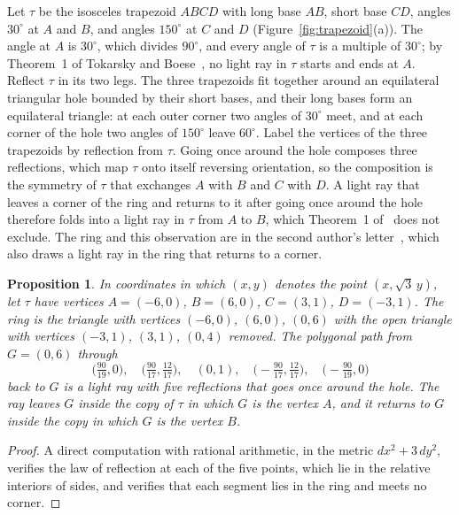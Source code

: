 \documentclass[11pt,a4paper]{article}
\theoremstyle{plain}
\newtheorem{proposition}[theorem]{Proposition}
\theoremstyle{definition}
\theoremstyle{remark}
\newcommand{\dg}{^\circ}
\numberwithin{equation}{section}
\begin{document}
Let $\tau$ be the isosceles trapezoid $ABCD$ with long base $AB$, short base $CD$, angles $30\dg$ at $A$ and $B$, and angles $150\dg$ at $C$ and $D$ (Figure~\ref{fig:trapezoid}(a)). The angle at $A$ is $30\dg$, which divides $90\dg$, and every angle of $\tau$ is a multiple of $30\dg$; by Theorem~1 of Tokarsky and Boese~\cite{TB}, no light ray in $\tau$ starts and ends at $A$. Reflect $\tau$ in its two legs. The three trapezoids fit together around an equilateral triangular hole bounded by their short bases, and their long bases form an equilateral triangle: at each outer corner two angles of $30\dg$ meet, and at each corner of the hole two angles of $150\dg$ leave $60\dg$. Label the vertices of the three trapezoids by reflection from $\tau$. Going once around the hole composes three reflections, which map $\tau$ onto itself reversing orientation, so the composition is the symmetry of $\tau$ that exchanges $A$ with $B$ and $C$ with $D$. A light ray that leaves a corner of the ring and returns to it after going once around the hole therefore folds into a light ray in $\tau$ from $A$ to $B$, which Theorem~1 of~\cite{TB} does not exclude. The ring and this observation are in the second author's letter~\cite[Figure~3(d),(f)]{Tok96}, which also draws a light ray in the ring that returns to a corner.

\begin{proposition}\label{prop:return}
In coordinates in which $(x,y)$ denotes the point $(x,\sqrt3\,y)$, let $\tau$ have vertices $A=(-6,0)$, $B=(6,0)$, $C=(3,1)$, $D=(-3,1)$. The ring is the triangle with vertices $(-6,0)$, $(6,0)$, $(0,6)$ with the open triangle with vertices $(-3,1)$, $(3,1)$, $(0,4)$ removed. The polygonal path from $G=(0,6)$ through
\[
\bigl(\tfrac{90}{19},0\bigr),\quad\bigl(\tfrac{90}{17},\tfrac{12}{17}\bigr),\quad(0,1),\quad\bigl(-\tfrac{90}{17},\tfrac{12}{17}\bigr),\quad\bigl(-\tfrac{90}{19},0\bigr)
\]
back to $G$ is a light ray with five reflections that goes once around the hole. The ray leaves $G$ inside the copy of $\tau$ in which $G$ is the vertex $A$, and it returns to $G$ inside the copy in which $G$ is the vertex $B$.
\end{proposition}

\begin{proof}
A direct computation with rational arithmetic, in the metric $dx^2+3\,dy^2$, verifies the law of reflection at each of the five points, which lie in the relative interiors of sides, and verifies that each segment lies in the ring and meets no corner.
\end{proof}
\end{document}

